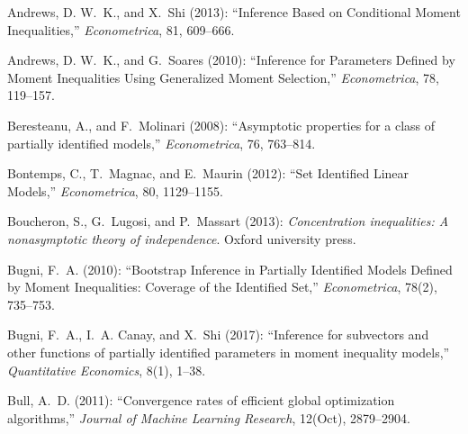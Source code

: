 \documentclass[letterpaper,11pt]{article}
\theoremstyle{myplain}
\theoremstyle{mydefinition}
\theoremstyle{myremark}
\numberwithin{equation}{section}
\numberwithin{figure}{section}
\begin{document}
\ifx\undefined\BySame
\newcommand{\BySame}{\leavevmode\rule[.5ex]{3em}{.5pt}\ }
\fi
\ifx\undefined\textsc
\newcommand{\textsc}[1]{{\sc #1}}
\newcommand{\emph}[1]{{\em #1\/}}
\let\tmpsmall\small
\renewcommand{\small}{\tmpsmall\sc}
\fi
\begin{thebibliography}{}

\textsc{Andrews, D. W.~K.,  {\small and} X.~Shi}  (2013): ``Inference Based on
  Conditional Moment Inequalities,'' \emph{Econometrica}, 81, 609--666.

\textsc{Andrews, D. W.~K.,  {\small and} G.~Soares}  (2010): ``Inference for
  Parameters Defined by Moment Inequalities Using Generalized Moment
  Selection,'' \emph{Econometrica}, 78, 119--157.

\textsc{Beresteanu, A.,  {\small and} F.~Molinari}  (2008): ``Asymptotic
  properties for a class of partially identified models,'' \emph{Econometrica},
  76, 763--814.

\textsc{Bontemps, C., T.~Magnac,  {\small and} E.~Maurin}  (2012): ``Set
  Identified Linear Models,'' \emph{Econometrica}, 80, 1129--1155.

\textsc{Boucheron, S., G.~Lugosi,  {\small and} P.~Massart}  (2013):
  \emph{Concentration inequalities: A nonasymptotic theory of independence}.
  Oxford university press.

\textsc{Bugni, F.~A.}  (2010): ``Bootstrap Inference in Partially Identified
  Models Defined by Moment Inequalities: Coverage of the Identified Set,''
  \emph{Econometrica}, 78(2), 735--753.

\textsc{Bugni, F.~A., I.~A. Canay,  {\small and} X.~Shi}  (2017): ``Inference
  for subvectors and other functions of partially identified parameters in
  moment inequality models,'' \emph{Quantitative Economics}, 8(1), 1--38.

\textsc{Bull, A.~D.}  (2011): ``Convergence rates of efficient global
  optimization algorithms,'' \emph{Journal of Machine Learning Research},
  12(Oct), 2879--2904.


\end{thebibliography}
\end{document}
